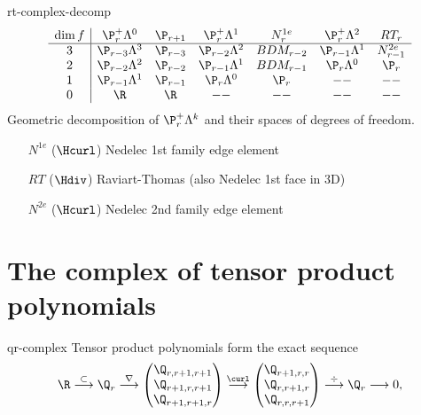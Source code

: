 \begin{Example}{rt-complex-decomp}
  \begin{gather}
    \begin{array}{c|cccccc}
      \dim f
      & \P_r^+\Lambda^0 & \P_{r+1}
      & \P_r^+\Lambda^1 & N^{1e}_r
      & \P_r^+\Lambda^2 & RT_r \\\hline
      3 & \P_{r-3}\Lambda^3 & \P_{r-3} & \P_{r-2}\Lambda^2 & BDM_{r-2} & \P_{r-1}\Lambda^1 & N^{2e}_{r-1} \\
      2 & \P_{r-2}\Lambda^2 & \P_{r-2} & \P_{r-1}\Lambda^1 & BDM_{r-1} & \P_{r}\Lambda^0 & \P_r\\
      1 & \P_{r-1}\Lambda^1 & \P_{r-1} & \P_{r}\Lambda^0   & \P_r  & -- & -- \\
      0 & \R & \R & -- & -- & --& --
    \end{array}
  \end{gather}
  Geometric decomposition of $\P_r^+\Lambda^k$ and their spaces of degrees of freedom.
  \begin{itemize}
  \item [$N^{1e}$] ($\Hcurl$) Nedelec 1st family edge element
  \item [$RT$] ($\Hdiv$) Raviart-Thomas (also Nedelec 1st face in 3D)
  \item [$N^{2e}$] ($\Hcurl$) Nedelec 2nd family edge element
  \end{itemize}
\end{Example}



\section{The complex of tensor product polynomials}

\begin{Lemma}{qr-complex}
  Tensor product polynomials form the exact sequence
  \begin{gather}
    \R
    \overset{\subset}{\longrightarrow} \Q_r
    \overset{\nabla}{\longrightarrow}
    \begin{pmatrix}
      \Q_{r,r+1,r+1}\\\Q_{r+1,r,r+1}\\\Q_{r+1,r+1,r}
    \end{pmatrix}
    \overset{\curl}{\longrightarrow}
    \begin{pmatrix}
      \Q_{r+1,r,r}\\\Q_{r,r+1,r}\\\Q_{r,r,r+1}
    \end{pmatrix}
    \overset{\div}{\longrightarrow}
    \Q_r
    \longrightarrow 0,    
  \end{gather}
\end{Lemma}

